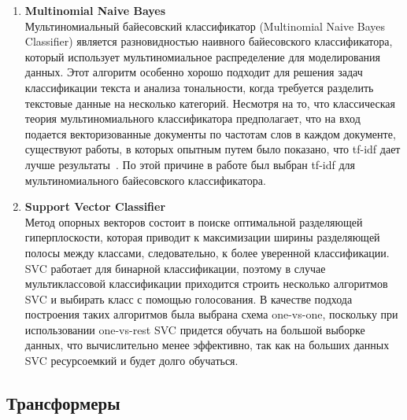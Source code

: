 \documentclass{article}
\begin{document}
\begin{enumerate}
    \item{\bfseries Multinomial Naive Bayes}\\
    Мультиномиальный байесовский классификатор (Multinomial Naive Bayes Classifier) является разновидностью наивного байесовского классификатора, который использует мультиномиальное распределение для моделирования данных. Этот алгоритм особенно хорошо подходит для решения задач классификации текста и анализа тональности, когда требуется разделить текстовые данные на несколько категорий. Несмотря на то, что классическая теория мультиномиального классификатора предполагает, что на вход подается векторизованные документы по частотам слов в каждом документе, существуют работы, в которых опытным путем было показано, что tf-idf дает лучше результаты~\cite{chingmuankin}. По этой причине в работе был выбран tf-idf для мультиномиального байесовского классификатора.

    \item{\bfseries Support Vector Classifier}\\
    Метод опорных векторов состоит в поиске оптимальной разделяющей гиперплоскости, которая приводит к максимизации ширины разделяющей полосы между классами, следовательно, к более уверенной классификации. SVC работает для бинарной классификации, поэтому в случае мультиклассовой классификации приходится строить несколько алгоритмов SVC и выбирать класс с помощью голосования. В качестве подхода построения таких алгоритмов была выбрана схема one-vs-one, поскольку при использовании one-vs-rest SVC придется обучать на большой выборке данных, что вычислительно менее эффективно, так как на больших данных SVC ресурсоемкий и будет долго обучаться.


    
\end{enumerate}
\subsection{Трансформеры}
\end{document}

